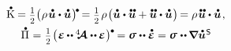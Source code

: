\vspace{.3em}

\nopagebreak\begin{equation*}
\begin{array}{c}
\mathdotabove{\kinetic} = \smalldisplaystyleonehalf \bigl( \hspace{.1ex} \rho \hspace{.2ex} \mathdotabove{\bm{u}} \dotp \mathdotabove{\bm{u}} \hspace{.1ex} \bigr)^{\hspace{-0.2ex}\tikz[baseline=-0.2ex] \draw[black, fill=black] (0,0) circle (.28ex);} \hspace{-0.2ex}
= \smalldisplaystyleonehalf \hspace{.2ex} \rho \hspace{.2ex} \bigl( \mathdotabove{\bm{u}} \dotp \mathdotdotabove{\bm{u}} + \mathdotdotabove{\bm{u}} \dotp \mathdotabove{\bm{u}} \hspace{.1ex} \bigr)
\hspace{-0.22ex} =
\rho \hspace{.2ex} \mathdotdotabove{\bm{u}} \dotp \mathdotabove{\bm{u}}
\hspace{.2ex} ,
\\[.5em]
%
\mathdotabove{\potential} \hspace{.1ex} = \hspace{.1ex} \smash{\smalldisplaystyleonehalf} \hspace{-0.25ex} \tikzmark{beginDerivativeOfElasticPotential} \left( \hspace{.1ex} \infinitesimaldeformation \hspace{-0.1ex} \dotdotp \hspace{-0.1ex} \stiffnesstensor \dotdotp \hspace{-0.1ex} \infinitesimaldeformation \hspace{.1ex} \right)^{\tikz[baseline=-0.2ex] \draw[black, fill=black] (0,0) circle (.28ex);} \hspace{-1.2ex} \tikzmark{endDerivativeOfElasticPotential} \hspace{.7ex}
= \linearstress \dotdotp \mathdotabove{\infinitesimaldeformation}
= \linearstress \hspace{.1ex} \dotdotp \hspace{-0.12ex} \boldnabla \mathdotabove{\bm{u}}^{\hspace{.1ex}\mathsf{S}} \hspace{-0.12ex}

\end{array}
\end{equation*}

